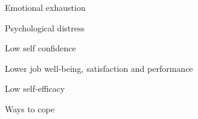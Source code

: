 \documentclass[aspectratio=169]{beamer}
\begin{document}
\begin{frame}
  \begin{center}
    \Huge Emotional exhaustion
    \\ \small \cite{hh15}
  \end{center}
\end{frame}


\begin{frame}
  \begin{center}
    \Huge Psychological distress
    \\ \small \cite{hh15}
  \end{center}
\end{frame}

\begin{frame}
  \begin{center}
    \Huge Low self confidence
    \\ \small \cite{hh15}
  \end{center}
\end{frame}

\begin{frame}
  \begin{center}
    \Huge Lower job well-being, satisfaction and performance
    \\ \small \cite{hh15}
  \end{center}
\end{frame}

\begin{frame}
  \begin{center}
    \Huge Low self-efficacy
    \\ \small \cite{feedback}
  \end{center}
\end{frame}

\begin{frame}
  \begin{center}
    \Huge Ways to cope
  \end{center}
\end{frame}
\end{document}
